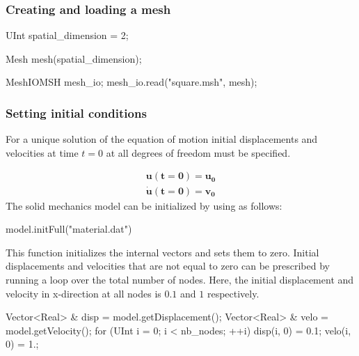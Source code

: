 \documentclass[a4paper,11pt]{book}
\renewcommand{\vec}[1]{\ensuremath{\boldsymbol{#1}}}
\begin{document}
\subsubsection{Creating and loading a mesh\label{sect:common:mesh}}

\begin{cpp}
  UInt spatial_dimension = 2;

  Mesh mesh(spatial_dimension);

  MeshIOMSH mesh_io;
  mesh_io.read("square.msh", mesh);
\end{cpp}

\subsubsection{Setting   initial  conditions  \label{sect:smm:initial_condition}}

For a unique solution of the equation of motion initial displacements and velocities at time $t=0$ at all degrees of freedom must be specified.

\begin{eqnarray}
 \vec{u(t=0)} = \vec{u_{0}}\\
 \vec{\dot u(t=0)} = \vec{v_{0}}
\end{eqnarray}
The solid mechanics model can be initialized by using as follows:
\begin{cpp}
  model.initFull("material.dat")
\end{cpp}
This function initializes the internal vectors and sets them to zero. Initial displacements and velocities that are not equal to zero can be prescribed by running a loop over the total number of nodes. Here, the initial displacement and velocity in x-direction at all nodes is $0.1$ and $1$ respectively.
\begin{cpp}
  Vector<Real> & disp = model.getDisplacement();
  Vector<Real> & velo = model.getVelocity();
  for (UInt i = 0; i < nb_nodes; ++i) {
      disp(i, 0) = 0.1;
      velo(i, 0) = 1.;
  }
\end{cpp}  
\end{document}
